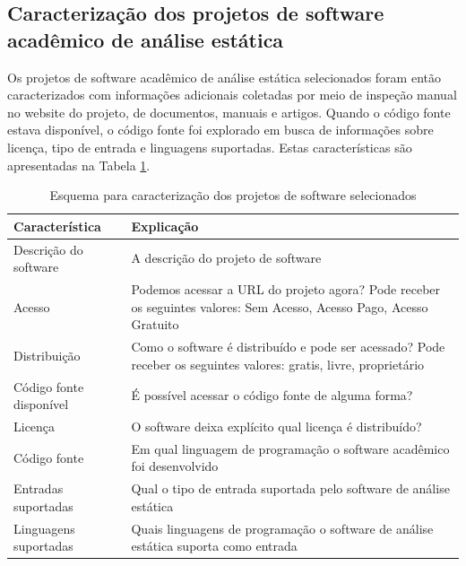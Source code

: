 
\subsection{Caracterização dos projetos de software acadêmico de análise estática} %

Os projetos de software acadêmico de análise estática selecionados foram então
caracterizados com informações adicionais coletadas por meio de inspeção manual
no website do projeto, de documentos, manuais e artigos. Quando o código fonte
estava disponível, o código fonte foi explorado em busca de informações sobre
licença, tipo de entrada e linguagens suportadas. Estas características são apresentadas
na Tabela \ref{esquema-caracteristicas}.


\begin{table}[h]
\caption{Esquema para caracterização dos projetos de software selecionados}
\centering
\begin{tabular}{ l p{11cm} }
  \hline
  Característica           & Explicação \\
  \hline
  Descrição do software    & A descrição do projeto de software \\
  Acesso                   & Podemos acessar a URL do projeto agora? Pode receber os seguintes valores: Sem Acesso, Acesso Pago, Acesso Gratuito \\
  Distribuição             & Como o software é distribuído e pode ser acessado? Pode receber os seguintes valores: gratis, livre, proprietário \\
  Código fonte disponível  & É possível acessar o código fonte de alguma forma? \\
  Licença                  & O software deixa explícito qual licença é distribuído? \\
  Código fonte             & Em qual linguagem de programação o software acadêmico foi desenvolvido \\
  Entradas suportadas      & Qual o tipo de entrada suportada pelo software de análise estática \\
  Linguagens suportadas    & Quais linguagens de programação o software de análise estática suporta como entrada \\
  \hline
\end{tabular}
\label{esquema-caracteristicas}
\end{table}

